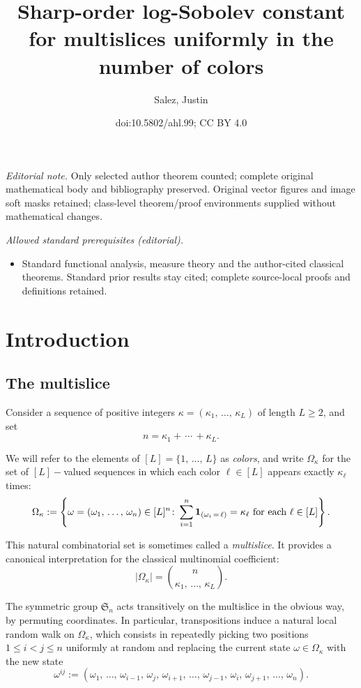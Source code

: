 \documentclass[10pt]{amsart}
\title{Sharp-order log-Sobolev constant for multislices uniformly in the number of colors}
\author{Salez, Justin}
\date{doi:10.5802/ahl.99; CC BY 4.0}
\theoremstyle{definition}\newtheorem{defi}[theo]{Definition}\newtheorem{rema}[theo]{Remark}\newtheorem{exam}[theo]{Example}\newtheorem{exem}[theo]{Example}\newtheorem{nota}[theo]{Notation}
\newcommand{\frkS}{\mathfrak{S}}
\newcommand{\bfun}{\bf 1}
\begin{document}
\maketitle
\noindent\textit{Editorial note.} Only selected author theorem counted; complete original mathematical body and bibliography preserved. Original vector figures and image soft masks retained; class-level theorem/proof environments supplied without mathematical changes.\par\medskip
\noindent\textit{Allowed standard prerequisites (editorial).}\begin{itemize}
\item Standard functional analysis, measure theory and the author-cited classical theorems. Standard prior results stay cited; complete source-local proofs and definitions retained.
\end{itemize}\medskip

\section{Introduction}
\subsection{The multislice}
Consider a sequence of positive integers $\kappa=(\kappa_1,\,\ldots,\,\kappa_L)$ of length $L\ge 2$, and set
\begin{equation}\label{sum}
n = \kappa_1+\,\cdots\,+\kappa_L.
\end{equation}

We will refer to the elements of $[L]=\{1,\,\ldots,\,L\}$ as \emph{colors}, and write $\Omega_\kappa$ for the set of $[L]-$valued sequences in which each color $\ell\in[L]$ appears exactly $\kappa_\ell$ times:
\[
\Omega_\kappa := \left\{\omega=\left(\omega_1,\,\ldots,\,\omega_n\right)\in[L]^n\colon \sum_{i=1}^n{\bfun}_{(\omega_i\,=\,\ell)} = \kappa_\ell \text{ for each }\ell\in[L] \right\}.
\]

This natural combinatorial set is sometimes called a \emph{multislice}. It provides a canonical interpretation for the classical multinomial coefficient:
\[
\left|\Omega_\kappa\right| = \binom{n}{\kappa_1,\,\ldots,\,\kappa_L}.
\]

The symmetric group $\frkS_n$ acts transitively on the multislice in the obvious way, by permuting coordinates. In particular, transpositions induce a natural local random walk on $\Omega_\kappa$, which consists in repeatedly picking two positions $1\le i<j\le n$ uniformly at random and replacing the current state $\omega\in\Omega_\kappa$ with the new state
\[
\omega^{ij} := \left(\omega_1,\,\ldots,\,\omega_{i-1},\,\omega_j,\,\omega_{i+1},\,\ldots,\,\omega_{j-1},\,\omega_i,\,\omega_{j+1},\,\ldots,\,\omega_n\right).
\]
\end{document}
